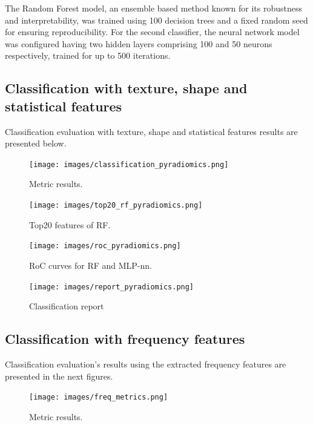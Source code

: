 \documentclass[11pt,a4paper]{article}
\begin{document}
		The Random Forest model, an ensemble based method known for its robustness and interpretability, 
		was trained using 100 decision trees and a fixed random seed for ensuring reproducibility. 
		For the second classifier, the neural network model was configured having
		two hidden layers comprising 100 and 50 neurons respectively, trained 
		for up to 500 iterations.

	\subsection{Classification with texture, shape and statistical features}

		Classification evaluation with texture, shape and statistical features results are presented below.
	
		\begin{figure}[h]
			\centering
			\texttt{[image: images/classification\_pyradiomics.png]}
			\caption{Metric results.}
			\label{fig1:}
		\end{figure}		

		\begin{figure}[h]
			\centering
			\texttt{[image: images/top20\_rf\_pyradiomics.png]}
			\caption{Top20 features of RF.}
			\label{fig1:}
		\end{figure}		

		\begin{figure}[H]
			\centering
			\texttt{[image: images/roc\_pyradiomics.png]}
			\caption{RoC curves for RF and MLP-nn.}
			\label{fig1:}
		\end{figure}		

		\begin{figure}[H]
			\centering
			\texttt{[image: images/report\_pyradiomics.png]}
			\caption{Classification report}
			\label{fig1:}
		\end{figure}		

	\subsection{Classification with frequency features}
		

		Classification evaluation's results using the extracted frequency features are presented in the 
		next figures.

		\begin{figure}[h]
			\centering
			\texttt{[image: images/freq\_metrics.png]}
			\caption{Metric results.}
			\label{fig1:}
		\end{figure}		
\end{document}
